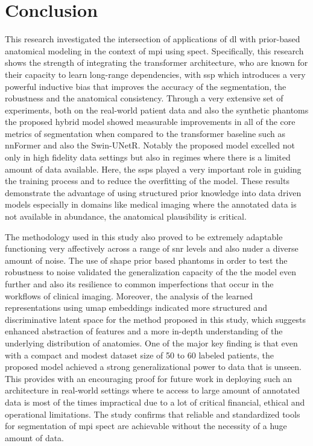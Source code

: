 \chapter{Conclusion}
\label{ch:conclusion}

This research investigated the intersection of applications of \gls{dl} with prior-based anatomical modeling in the context of \gls{mpi} using \gls{spect}. Specifically, this research shows the strength of integrating the transformer architecture, who are known for their capacity to learn long-range dependencies, with \gls{ssp} which introduces a very powerful inductive bias that improves the accuracy of the segmentation, the robustness and the anatomical consistency. Through a very extensive set of experiments, both on the real-world patient data and also the synthetic phantoms the proposed hybrid model showed measurable improvements in all of the core metrics of segmentation when compared to the transformer baseline such as nnFormer and also the Swin-UNetR. Notably the proposed model excelled not only in high fidelity data settings but also in regimes where there is a limited amount of data available. Here, the \gls{ssp}s played a very important role in guiding the training process and to reduce the overfitting of the model. These results demonstrate the advantage of using structured prior knowledge into data driven models especially in domains like medical imaging where the annotated data is not available in abundance, the anatomical plausibility is critical.

The methodology used in this study also proved to be extremely adaptable functioning very affectively across a range of \gls{snr} levels and also nuder a diverse amount of noise. The use of shape prior based phantoms in order to test the robustness to noise validated the generalization capacity of the the model even further and also its resilience to common imperfections that occur in the workflows of clinical imaging. Moreover, the analysis of the learned representations using \gls{umap} embeddings indicated more structured and discriminative latent space for the method proposed in this study, which suggests enhanced abstraction of features and a more in-depth understanding of the underlying distribution of anatomies. One of the major key finding is that even with a compact and modest dataset size of 50 to 60 labeled patients, the proposed model achieved a strong generalizational power to data that is unseen. This provides with an encouraging proof for future work in deploying such an architecture in real-world settings where te access to large amount of annotated data is most of the times impractical due to a lot of critical financial, ethical and operational limitations. The study confirms that reliable and standardized tools for segmentation of \gls{mpi} \gls{spect} are achievable without the necessity of a huge amount of data.

